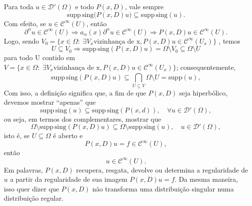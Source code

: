 \documentclass[../distribution_theory_notes.tex]{subfiles}
\begin{document}
\begin{tcolorbox}[
		skin=enhanced,
		title=Observação,
		fonttitle=\bfseries,
		colframe=black,
		colbacktitle=cyan!75!white,
		colback=cyan!15,
		colbacklower=black,
		coltitle=black,
		drop fuzzy shadow,
	]
	Para toda \(u\in\mathcal{D}'(\Omega)\) e todo \(P(x,D)\), vale sempre
	\[
		\mathrm{supp\,sing}\bigl(P(x,D)u\bigr)
		\subseteq \mathrm{supp\,sing}(u).
	\]
	Com efeito, se \(u\in\mathcal{C}^{\infty}(U)\), então
	\[
		\partial^{\alpha}u\in\mathcal{C}^{\infty}(U)
		\Longrightarrow
		a_{\alpha}(x)\partial^{\alpha}u\in\mathcal{C}^{\infty}(U)
		\Longrightarrow
		P(x,D)u\in\mathcal{C}^{\infty}(U).
	\]
	Logo, sendo \(V_{0} = \{x\in \Omega :\; \exists V_{x} \text{vizinhança de x}, P(x, D)u\in \mathcal{C}^{\infty}(U_{x})\}\)	, temos
	\[
		U\subseteq V_{0} \Rightarrow \mathrm{supp\,sing}(P(x, D)u) = \Omega \setminus{V_{0}}\subseteq \Omega \setminus{U}
	\]
	para todo U contido em \(V = \{x\in \Omega :\; \exists V_{x} \text{vizinhança de x}, P(x, D)u\in \mathcal{C}^{\infty}(U_{x})\}\); consequentemente,
	\[
		\mathrm{supp\,sing}(P(x, D)u)\subseteq \bigcap_{U\subseteq V}^{}\Omega \setminus{U}=\mathrm{supp}(u),
	\]
	Com isso, a definição significa que, a fim de que \(P(x, D)\) seja hiperbólico, devemos mostrar ``apenas'' que
	\[
		\mathrm{supp\, sing}(u)\subseteq \mathrm{supp\, sing}(P(x, d)), \quad \forall u\in \mathcal{D}'(\Omega),
	\]
	ou seja, em termos dos complementares, mostrar que
	\[
		\Omega\setminus{\mathrm{supp\, sing}(P(x, D)u)} \subseteq \Omega \setminus{\mathrm{supp\, sing}(u)}, \quad u\in \mathcal{D}'(\Omega ),
	\]
	isto é, se \(U\subseteq\Omega\) é aberto e
	\[
		P(x,D)u=f\in\mathcal{C}^{\infty}(U),
	\]
	então
	\[
		u\in\mathcal{C}^{\infty}(U).
	\]
	Em palavras, \(P(x,D)\) recupera, resgata, devolve ou determina a regularidade de \(u\) a partir da regularidade de sua imagem \(P(x,D)u=f\). Da mesma maneira, isso quer dizer que \(P(x,D)\) não transforma uma distribuição singular numa distribuição regular.
\end{tcolorbox}
\end{document}
